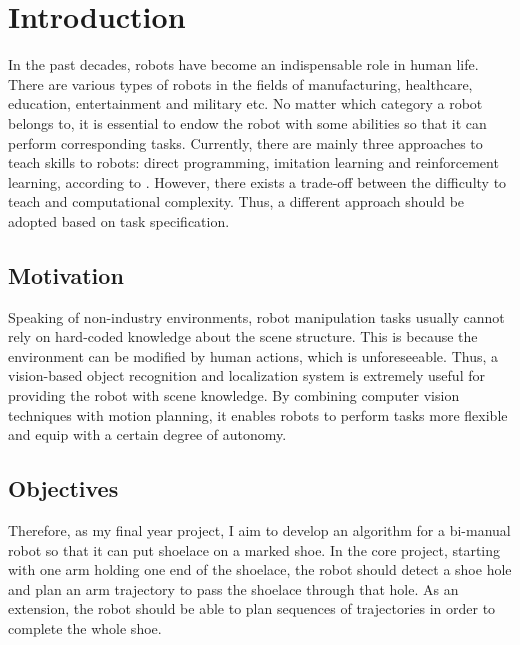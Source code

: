 \chapter{Introduction}

In the past decades, robots have become an indispensable role in human life. There are various types of robots in the fields of manufacturing, healthcare, education, entertainment and military etc. No matter which category a robot belongs to, it is essential to endow the robot with some abilities so that it can perform corresponding tasks. Currently, there are mainly three approaches to teach skills to robots: direct programming, imitation learning and reinforcement learning, according to \citep{Kormushev_MDPI_2013}. However, there exists a trade-off between the difficulty to teach and computational complexity. Thus, a different approach should be adopted based on task specification.

\section{Motivation}
Speaking of non-industry environments, robot manipulation tasks usually cannot rely on hard-coded knowledge about the scene structure. This is because the environment can be modified by human actions, which is unforeseeable. Thus, a vision-based object recognition and localization system is extremely useful for providing the robot with scene knowledge. By combining computer vision techniques with motion planning, it enables robots to perform tasks more flexible and equip with a certain degree of autonomy.

\section{Objectives}
Therefore, as my final year project, I aim to develop an algorithm for a bi-manual robot so that it can put shoelace on a marked shoe. In the core project, starting with one arm holding one end of the shoelace, the robot should detect a shoe hole and plan an arm trajectory to pass the shoelace through that hole. As an extension, the robot should be able to plan sequences of trajectories in order to complete the whole shoe.

